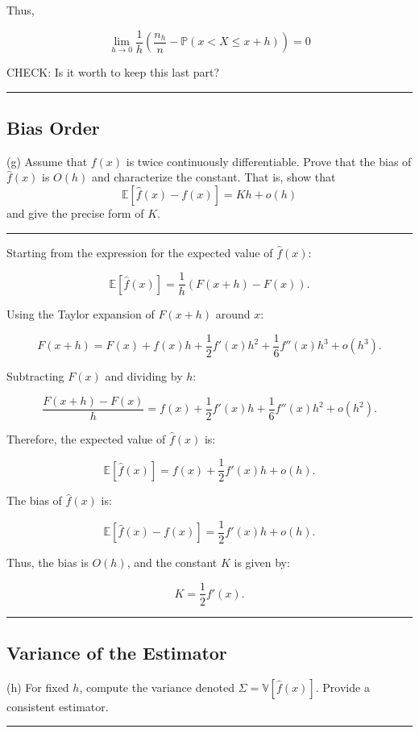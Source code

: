 \documentclass{article}
\newenvironment{colorparagraph}[1]{\par\color{#1}}{\par}
\begin{document}
Thus,

$$
\lim_{h \to 0} \frac{1}{h} \left(
    \frac{n_h}{n}
    - \mathbb{P}(x < X \leq x + h)
  \right) = 0
$$

\begin{colorparagraph}{tacolor}CHECK:
Is it worth to keep this last part?
\end{colorparagraph}


\begin{colorparagraph}{questioncolor}
\label{q2g}
\rule{\textwidth}{0.5pt}
\subsection{Bias Order}
(g) Assume that \( f(x) \) is twice continuously differentiable. Prove that the bias of \( \hat{f}(x) \) is \( O(h) \) and characterize the constant. That is, show that
\[
\mathbb{E}[\hat{f}(x) - f(x)] = Kh + o(h)
\]
and give the precise form of \( K \).

\rule{\textwidth}{0.5pt}
\end{colorparagraph}

Starting from the expression for the expected value of \( \hat{f}(x) \):

\[
\mathbb{E}[\hat{f}(x)] = \frac{1}{h} \left( F(x + h) - F(x) \right).
\]

Using the Taylor expansion of \( F(x + h) \) around \( x \):

\[
F(x + h) = F(x) + f(x) h + \frac{1}{2} f'(x) h^2 + \frac{1}{6} f''(x) h^3 + o(h^3).
\]

Subtracting \( F(x) \) and dividing by \( h \):

\[
\frac{F(x + h) - F(x)}{h} = f(x) + \frac{1}{2} f'(x) h + \frac{1}{6} f''(x) h^2 + o(h^2).
\]

Therefore, the expected value of \( \hat{f}(x) \) is:

\[
\mathbb{E}[\hat{f}(x)] = f(x) + \frac{1}{2} f'(x) h + o(h).
\]

The bias of \( \hat{f}(x) \) is:

\[
\mathbb{E}[\hat{f}(x) - f(x)] = \frac{1}{2} f'(x) h + o(h).
\]

Thus, the bias is \( O(h) \), and the constant \( K \) is given by:

\[
K = \frac{1}{2} f'(x).
\]

\begin{colorparagraph}{questioncolor}
\label{q2h}
\rule{\textwidth}{0.5pt}
\subsection{Variance of the Estimator}
(h) For fixed \( h \), compute the variance denoted \( \Sigma = \mathbb{V}[\hat{f}(x)] \). Provide a consistent estimator.

\rule{\textwidth}{0.5pt}
\end{colorparagraph}
\end{document}
